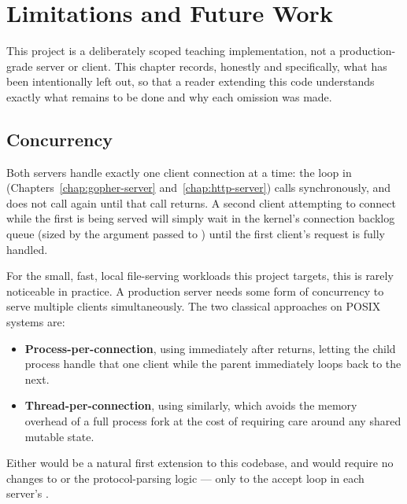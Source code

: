 \chapter{Limitations and Future Work}
\label{chap:limitations}

This project is a deliberately scoped teaching implementation, not a production-grade server or client. This chapter records, honestly and specifically, what has been intentionally left out, so that a reader extending this code understands exactly what remains to be done and why each omission was made.

\section{Concurrency}

Both servers handle exactly one client connection at a time: the  loop in  (Chapters~\ref{chap:gopher-server} and~\ref{chap:http-server}) calls  synchronously, and does not call  again until that call returns. A second client attempting to connect while the first is being served will simply wait in the kernel's connection backlog queue (sized by the  argument passed to ) until the first client's request is fully handled.

For the small, fast, local file-serving workloads this project targets, this is rarely noticeable in practice. A production server needs some form of concurrency to serve multiple clients simultaneously. The two classical approaches on POSIX systems are:

\begin{itemize}
    \item \textbf{Process-per-connection}, using  immediately after  returns, letting the child process handle that one client while the parent immediately loops back to  the next.
    \item \textbf{Thread-per-connection}, using  similarly, which avoids the memory overhead of a full process fork at the cost of requiring care around any shared mutable state.
\end{itemize}

Either would be a natural first extension to this codebase, and would require no changes to  or the protocol-parsing logic --- only to the accept loop in each server's .

